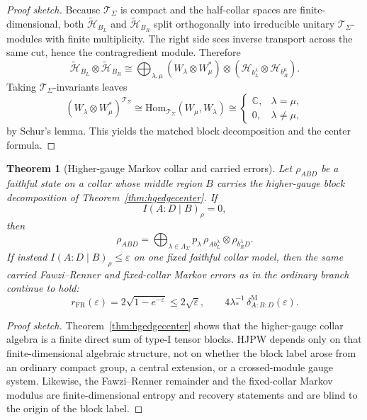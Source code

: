 \documentclass[11pt]{article}
\newtheorem{theorem}{Theorem}[section]
\begin{document}
\begin{proof}[Proof sketch]
Because \(\mathcal T_\Sigma\) is compact and the half-collar spaces are finite-dimensional, both \(\widetilde{\mathcal H}_{B_L}\) and \(\widetilde{\mathcal H}_{B_R}\) split orthogonally into irreducible unitary \(\mathcal T_\Sigma\)-modules with finite multiplicity. The right side sees inverse transport across the same cut, hence the contragredient module. Therefore
\[
\widetilde{\mathcal H}_{B_L}\otimes \widetilde{\mathcal H}_{B_R}
\cong
\bigoplus_{\lambda,\mu}
(W_\lambda\otimes W_\mu^*)\otimes
(\mathcal H_{b_L^\lambda}\otimes \mathcal H_{b_R^\mu}).
\]
Taking \(\mathcal T_\Sigma\)-invariants leaves
\[
(W_\lambda\otimes W_\mu^*)^{\mathcal T_\Sigma}
\cong
\mathrm{Hom}_{\mathcal T_\Sigma}(W_\mu,W_\lambda)
\cong
\begin{cases}
\mathbb C, & \lambda=\mu,\\
0, & \lambda\neq\mu,
\end{cases}
\]
by Schur's lemma. This yields the matched block decomposition and the center formula.
\end{proof}

\begin{theorem}[Higher-gauge Markov collar and carried errors]\label{thm:hgmarkov}
Let \(\rho_{ABD}\) be a faithful state on a collar whose middle region \(B\) carries the higher-gauge block decomposition of Theorem~\ref{thm:hgedgecenter}. If
\[
I(A:D\mid B)_\rho=0,
\]
then
\[
\rho_{ABD}
=
\bigoplus_{\lambda\in\Lambda_\Sigma}
p_\lambda\,
\rho_{A b_L^\lambda}\otimes \rho_{b_R^\lambda D}.
\]
If instead \(I(A:D\mid B)_\rho\le \varepsilon\) on one fixed faithful collar model, then the same carried Fawzi--Renner and fixed-collar Markov errors as in the ordinary branch continue to hold:
\[
r_{\mathrm{FR}}(\varepsilon)=2\sqrt{1-e^{-\varepsilon}}\le 2\sqrt{\varepsilon},
\qquad
4\lambda_\ast^{-1}\,\delta^{\mathrm M}_{A:B:D}(\varepsilon).
\]
\end{theorem}

\begin{proof}[Proof sketch]
Theorem~\ref{thm:hgedgecenter} shows that the higher-gauge collar algebra is a finite direct sum of type-I tensor blocks. HJPW depends only on that finite-dimensional algebraic structure, not on whether the block label arose from an ordinary compact group, a central extension, or a crossed-module gauge system. Likewise, the Fawzi--Renner remainder and the fixed-collar Markov modulus are finite-dimensional entropy and recovery statements and are blind to the origin of the block label.
\end{proof}
\end{document}
